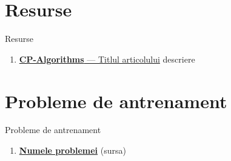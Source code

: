 \documentclass[10pt]{beamer}
\begin{document}
\section{Resurse}

\begin{frame}[t]{Resurse}
  \begin{enumerate}
    \item \href{https://cp-algorithms.com}{\textbf{CP-Algorithms} --- Titlul articolului}
          \textemdash{} descriere
  \end{enumerate}
\end{frame}

\section{Probleme de antrenament}

\begin{frame}[t]{Probleme de antrenament}
  \begin{enumerate}
    \item \href{URL}{\textbf{Numele problemei}} (sursa)
  \end{enumerate}
\end{frame}
\end{document}
